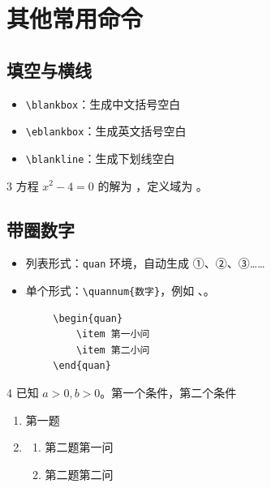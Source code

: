 \documentclass[
showanswers,        %
answercolor=red,    %
numbercolor=blue,   %
paper=a3,           %
nojuemi,              %
nozhuyishixiang,      %
example,        %
]{biscuits}
\begin{document}
	\chapter{其他常用命令}
	
	\section{填空与横线}
	
	\begin{itemize}
		\item \verb|\blankbox|：生成中文括号空白 \blankbox{}
		\item \verb|\eblankbox|：生成英文括号空白 \eblankbox{}
		\item \verb|\blankline|：生成下划线空白 \blankline{}
	\end{itemize}
	
	\begin{example}{3}
		方程 $x^2-4=0$ 的解为 \blankbox{} ，定义域为 \blankline{} 。
	\end{example}
	
	\section{带圈数字}
	
	\begin{itemize}
		\item 列表形式：\texttt{quan} 环境，自动生成 ①、②、③……
		\item 单个形式：\verb|\quannum{数字}|，例如 、。
	\end{itemize}
	
	\begin{verbatim}
		\begin{quan}
			\item 第一小问
			\item 第二小问
		\end{quan}
	\end{verbatim}
	
	\begin{example}{4}
		已知 $a>0,b>0$。第一个条件，第二个条件
\begin{enumerate}
	\item 第一题
	\item \begin{enumerate}
		\item 第二题第一问
		\item 第二题第二问
	\end{enumerate}
\end{enumerate}

	\end{example}
	
\end{document}
